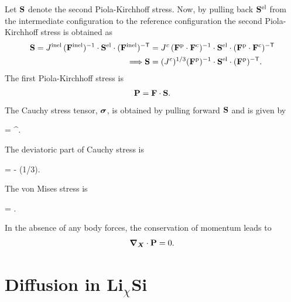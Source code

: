 Let $\mathbf{S}$ denote the second Piola-Kirchhoff stress. Now, by pulling back $\mathbf{S}^{{\rm{el}}}$ from the intermediate configuration to the reference configuration \citep{2010Gurtin} the second Piola-Kirchhoff stress is obtained as
\begin{align}
    \mathbf{S} = J^{{\rm{inel}}} \, (\mathbf{F}^{\rm{inel}})^{-1} \cdot  \mathbf{S}^{\rm{el}} \cdot  (\mathbf{F}^{\rm{inel}})^{{-\sf {T}}} &= {J^c} \, (\mathbf{F}^{{\rm{p}}} \cdot \mathbf{F}^{{\rm{c}}})^{-1} \cdot \mathbf{S}^{{\rm{el}}} \cdot (\mathbf{F}^{\rm{p}} \cdot \mathbf{F}^{\rm{c}})^{{-\sf {T}}}\nonumber\\
    \Longrightarrow \mathbf{S} &= ({J^c})^{1/3} (\mathbf{F}^{\rm{p}})^{-1} \cdot \mathbf{S}^{{\rm{el}}} \cdot  (\mathbf{F}^{\rm{p}})^{{-\sf {T}}}.\label{eq:S_tensor}
\end{align}
The first Piola-Kirchhoff stress is
\begin{gather}
    \mathbf{P} = \mathbf{F} \cdot  \mathbf{S}  \label{eq:P_tensor}.
\end{gather}
The Cauchy stress tensor, $\bm{\sigma}$, is obtained by pulling forward $\mathbf{S}$ and is given by
\begin{nonumbereq}\CS =  \F \cdot  \PKS  \cdot  \F^\T.
\end{nonumbereq} The deviatoric part of Cauchy stress is \begin{nonumbereq}\DCS = \CS - (1/3)\tr{\CS}\I.
\end{nonumbereq}
The von Mises stress is 
\begin{nonumbereq}
    \sigmaeff = . 
\end{nonumbereq}

In the absence of any body forces, the conservation of momentum leads to 
\begin{gather}
\bm{\nabla}_{\bm{X}} \cdot \mathbf{P} = 0.
\end{gather}


\section{Diffusion in Li$_\chi$Si}

